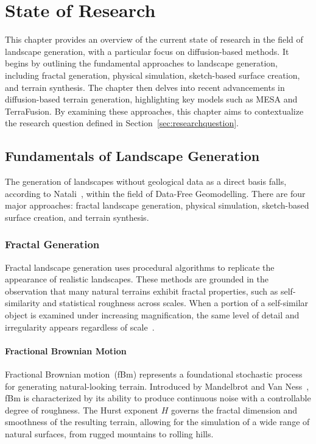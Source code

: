 \chapter{State of Research}
\label{cha:state_of_research}

This chapter provides an overview of the current state of research in the field of landscape generation, with a particular focus on diffusion-based methods. It begins by outlining the fundamental approaches to landscape generation, including fractal generation, physical simulation, sketch-based surface creation, and terrain synthesis. The chapter then delves into recent advancements in diffusion-based terrain generation, highlighting key models such as MESA and TerraFusion. By examining these approaches, this chapter aims to contextualize the research question defined in Section~\ref{sec:researchquestion}.

\section{Fundamentals of Landscape Generation}
\label{sec:landscape_fundamentals}

The generation of landscapes without geological data as a direct basis falls, according to Natali~\cite{Natali2013}, within the field of Data-Free Geomodelling. There are four major approaches: fractal landscape generation, physical simulation, sketch-based surface creation, and terrain synthesis.

\subsection{Fractal Generation}
\label{subsec:fractal_generation}

Fractal landscape generation uses procedural algorithms to replicate the appearance of realistic landscapes. These methods are grounded in the observation that many natural terrains exhibit fractal properties, such as self-similarity and statistical roughness across scales. When a portion of a self-similar object is examined under increasing magnification, the same level of detail and irregularity appears regardless of scale~\cite{fournier1982computer}.

\subsubsection{Fractional Brownian Motion}

Fractional Brownian motion~(fBm) represents a foundational stochastic process for generating natural-looking terrain. Introduced by Mandelbrot and Van Ness~\cite{mandelbrot1968fractional}, fBm is characterized by its ability to produce continuous noise with a controllable degree of roughness. The Hurst exponent $H$ governs the fractal dimension and smoothness of the resulting terrain, allowing for the simulation of a wide range of natural surfaces, from rugged mountains to rolling hills.

